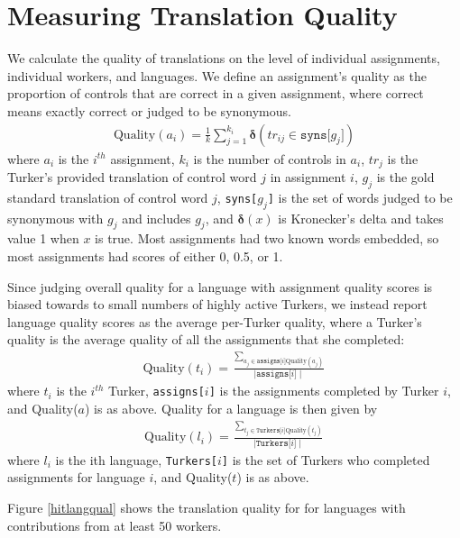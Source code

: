 \documentclass[11pt]{article}
\begin{document}
\section{Measuring Translation Quality}

We calculate the quality of translations on the level of individual assignments, individual workers, and languages.  We define an assignment's quality as the proportion of controls that are correct in a given assignment, where correct means exactly correct or judged to be synonymous.
\begin{align}	
	\text{Quality}(a_i) = \frac{1}{k}\sum\limits_{j=1}^{k_i}\mathbf{\delta}(tr_{ij} \in \texttt{syns[$g_j$]})
\end{align}	
where $a_i$ is the $i^{th}$ assignment, $k_i$ is the number of controls in $a_i$, $tr_j$ is the Turker's provided translation of control word $j$ in assignment $i$, $g_j$ is the gold standard translation of control word $j$, \texttt{syns[$g_j$]} is the set of words judged to be synonymous with $g_j$ and includes $g_j$, and $\mathbf{\delta}(x)$ is Kronecker's delta and takes value 1 when $x$ is true. 
Most assignments had two known words embedded, so most assignments had scores of either 0, 0.5, or 1. 

Since judging overall quality for a language with assignment quality scores is biased towards to small numbers of highly active Turkers, we instead report language quality scores as the average per-Turker quality, where a Turker's quality is  the average quality of all the assignments that she completed:
\begin{align}	
	\text{Quality}(t_i) = \frac{\sum_{a_j \in \texttt{assigns[$i$]}\text{Quality}(a_j)}}{\mid \texttt{assigns[$i$]} \mid}
\end{align}	
where $t_i$ is the $i^{th}$ Turker, \texttt{assigns[$i$]} is the assignments completed by Turker $i$, and Quality($a$) is as above.
%
Quality for a language is then given by
\begin{align}	
	\text{Quality}(l_i) = \frac{\sum_{t_j \in \texttt{Turkers[$i$]}\text{Quality}(t_j)}}{\mid \texttt{Turkers[$i$]} \mid}
\end{align}	
where $l_i$ is the ith language, \texttt{Turkers[$i$]} is the set of Turkers who completed assignments for language $i$, and Quality($t$) is as above.


Figure \ref{hitlangqual} shows the translation quality for for languages with contributions from at least 50 workers.  
\end{document}
